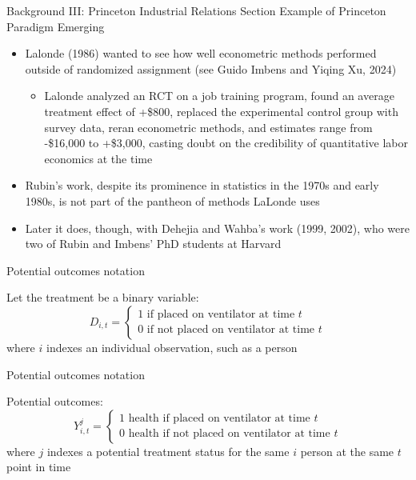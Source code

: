 \documentclass{beamer}
\begin{document}
\begin{frame}{Background III: Princeton Industrial Relations Section}
Example of Princeton Paradigm Emerging
  \begin{itemize}
    \item Lalonde (1986) wanted to see how well econometric methods performed outside of randomized assignment (see Guido Imbens and Yiqing Xu, 2024)
    	\begin{itemize}
    \item Lalonde analyzed an RCT on a job training program, found an average treatment effect of +\$800, replaced the experimental control group with survey data, reran econometric methods, and estimates range from -\$16,000 to +\$3,000, casting doubt on the credibility of quantitative labor economics at the time
    	\end{itemize}
    \item  Rubin's work, despite its prominence in statistics in the 1970s and early 1980s, is not part of the pantheon of methods LaLonde uses 
    \item Later it does, though, with Dehejia and Wahba's work (1999, 2002), who were two of Rubin and Imbens' PhD students at Harvard
  \end{itemize}
\end{frame}




\begin{frame}{Potential outcomes notation}

Let the treatment be a binary variable: $$D_{i,t} =\begin{cases} 1 \text{ if placed on ventilator at time $t$} \\ 0 \text{ if not placed on ventilator at time $t$} \end{cases}$$where $i$ indexes an individual observation, such as a person
\end{frame}

\begin{frame}{Potential outcomes notation}

Potential outcomes: $$Y_{i,t}^j =\begin{cases} 1 \text{ health if placed on ventilator at time $t$} \\ 0 \text{ health if not placed on ventilator at time $t$} \end{cases}$$where $j$ indexes a potential treatment status for the same $i$ person at the same $t$ point in time
\end{frame}
\end{document}

